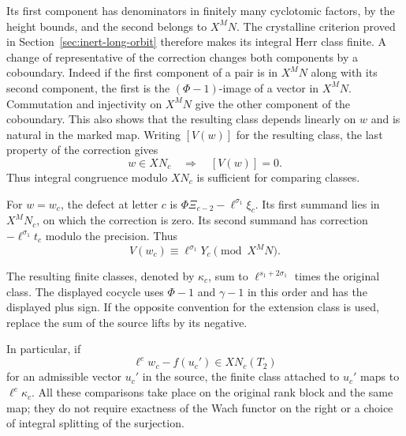 Its first component has denominators in finitely many
cyclotomic factors, by the height bounds, and the second
belongs to \(X^MN\). The crystalline criterion proved in
Section~\ref{sec:inert-long-orbit} therefore makes its
integral Herr class finite. A change of representative of
the correction changes both components by a coboundary.
Indeed if the first component of a pair is in \(X^MN\)
along with its second component, the first is the
\((\Phi-1)\)-image of a vector in \(X^MN\). Commutation
and injectivity on \(X^MN\) give the other component of
the coboundary. This also shows that the resulting class
depends linearly on \(w\) and is natural in the marked map.
Writing \([V(w)]\) for the resulting class, the last property of the correction gives
\[
 w\in XN_c\quad\Longrightarrow\quad[V(w)]=0.
\]
Thus integral congruence modulo \(XN_c\) is
sufficient for comparing classes.

For \(w=w_c\), the defect at letter \(c\) is
\(\Phi\Xi_{c-2}-\ell^{\sigma_1}\xi_c\).
Its first summand lies in \(X^MN_c\), on which the
correction is zero. Its second summand has correction
\(-\ell^{\sigma_1}t_c\) modulo the precision.
Thus
\[
 V(w_c)\equiv\ell^{\sigma_1}Y_c\pmod{X^MN}.
\]

The resulting finite classes, denoted by \(\kappa_c\), sum
to \(\ell^{s_1+2\sigma_1}\) times the original class.
The displayed cocycle uses \(\Phi-1\) and \(\gamma-1\)
in this order and has the displayed plus sign. If the
opposite convention for the extension class is used, replace
the sum of the source lifts by its negative.

In particular, if
\[
 \ell^e w_c-f(u_c')\in XN_c(T_2)
\]
for an admissible vector \(u_c'\) in the source, the
finite class attached to \(u_c'\) maps to
\(\ell^e\kappa_c\). All these comparisons take place on
the original rank block and the same map; they do not
require exactness of the Wach functor on the right or a
choice of integral splitting of the surjection.
\label{cor:inert-thick-herr-2}
